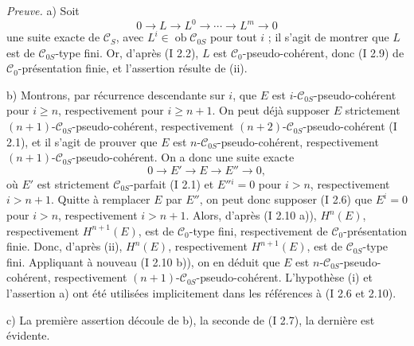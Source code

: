 \documentclass[11pt]{article}
\providecommand{\Ob}{\operatorname{ob}}
\begin{document}
\emph{Preuve.} a) Soit
\[
0\longrightarrow L\longrightarrow L^0\longrightarrow\cdots\longrightarrow L^m\longrightarrow0
\]
une suite exacte de $\mathcal C_S$, avec $L^i\in\Ob\mathcal C_{0S}$ pour tout $i$ ; il s'agit de montrer que $L$ est de $\mathcal C_{0S}$-type fini. Or, d'après (I 2.2), $L$ est $\mathcal C_0$-pseudo-cohérent, donc (I 2.9) de $\mathcal C_0$-présentation finie, et l'assertion résulte de (ii).

b) Montrons, par récurrence descendante sur $i$, que $E$ est $i$-$\mathcal C_{0S}$-pseudo-cohérent pour $i\ge n$, respectivement pour $i\ge n+1$. On peut déjà supposer $E$ strictement $(n+1)$-$\mathcal C_{0S}$-pseudo-cohérent, respectivement $(n+2)$-$\mathcal C_{0S}$-pseudo-cohérent (I 2.1), et il s'agit de prouver que $E$ est $n$-$\mathcal C_{0S}$-pseudo-cohérent, respectivement $(n+1)$-$\mathcal C_{0S}$-pseudo-cohérent. On a donc une suite exacte
\[
0\longrightarrow E'\longrightarrow E\longrightarrow E''\longrightarrow0,
\]
où $E'$ est strictement $\mathcal C_{0S}$-parfait (I 2.1) et $E''{}^i=0$ pour $i>n$, respectivement $i>n+1$. Quitte à remplacer $E$ par $E''$, on peut donc supposer (I 2.6) que $E^i=0$ pour $i>n$, respectivement $i>n+1$. Alors, d'après (I 2.10 a)), $H^n(E)$, respectivement $H^{n+1}(E)$, est de $\mathcal C_0$-type fini, respectivement de $\mathcal C_0$-présentation finie. Donc, d'après (ii), $H^n(E)$, respectivement $H^{n+1}(E)$, est de $\mathcal C_{0S}$-type fini. Appliquant à nouveau (I 2.10 b)), on en déduit que $E$ est $n$-$\mathcal C_{0S}$-pseudo-cohérent, respectivement $(n+1)$-$\mathcal C_{0S}$-pseudo-cohérent. L'hypothèse (i) et l'assertion a) ont été utilisées implicitement dans les références à (I 2.6 et 2.10).

c) La première assertion découle de b), la seconde de (I 2.7), la dernière est évidente.
\end{document}
